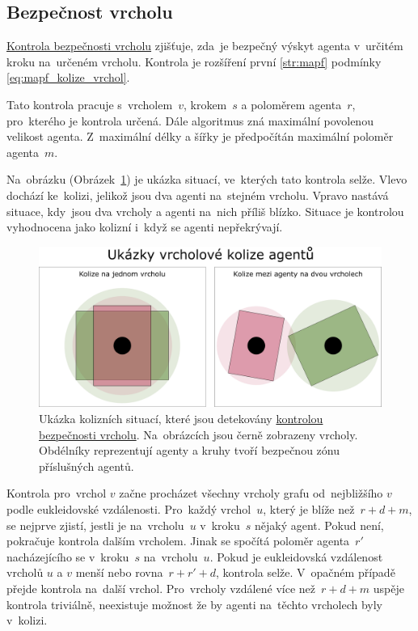 \subsection{Bezpečnost vrcholu}\label{subsec:bezpecnost_vrcholu}


\hyperref[subsec:bezpecnost_vrcholu]{Kontrola bezpečnosti vrcholu} zjišťuje,
zda~je bezpečný výskyt agenta v~určitém kroku na~určeném vrcholu.
Kontrola je rozšíření první \ref{str:mapf} podmínky
 \eqref{eq:mapf_kolize_vrchol}.

Tato kontrola pracuje s~vrcholem~$v$, krokem~$s$ a poloměrem agenta~$r$, pro~kterého je kontrola určená.
Dále algoritmus zná maximální povolenou velikost agenta.
Z~maximální délky a šířky je předpočítán maximální poloměr agenta~$m$.

Na~obrázku (Obrázek~\ref{fig:kolize_na_vrcholu}) je ukázka situací, ve~kterých tato kontrola selže.
Vlevo dochází ke~kolizi, jelikož jsou dva agenti na~stejném vrcholu.
Vpravo nastává situace, kdy~jsou dva vrcholy a agenti na~nich příliš blízko.
Situace je kontrolou vyhodnocena jako kolizní i~když se agenti nepřekrývají.

\begin{figure}[h]
	\centering
	\includegraphics[width=\textwidth]{../img/kolize_vrchol}
	\caption{
		Ukázka kolizních situací, které jsou detekovány \hyperref[subsec:bezpecnost_vrcholu]{kontrolou bezpečnosti vrcholu}.
		Na~obrázcích jsou černě zobrazeny vrcholy.
		Obdélníky reprezentují agenty a kruhy tvoří bezpečnou zónu příslušných agentů.
	}
	\label{fig:kolize_na_vrcholu}
\end{figure}

Kontrola pro~vrchol $v$ začne procházet všechny vrcholy grafu od~nejbližšího $v$ podle eukleidovské vzdálenosti.
Pro~každý vrchol~$u$, který je blíže než~$r + d + m$, se nejprve zjistí,
jestli je na~vrcholu~$u$ v~kroku~$s$ nějaký agent.
Pokud není, pokračuje kontrola dalším vrcholem.
Jinak se spočítá poloměr agenta~$r'$ nacházejícího se v~kroku~$s$ na~vrcholu~$u$.
Pokud je eukleidovská vzdálenost vrcholů $u$ a $v$ menší nebo rovna~$r + r' + d$, kontrola selže.
V~opačném případě přejde kontrola na~další vrchol.
Pro~vrcholy vzdálené více než~$r + d + m$ uspěje kontrola triviálně,
neexistuje možnost že by agenti na~těchto vrcholech byly v~kolizi.

